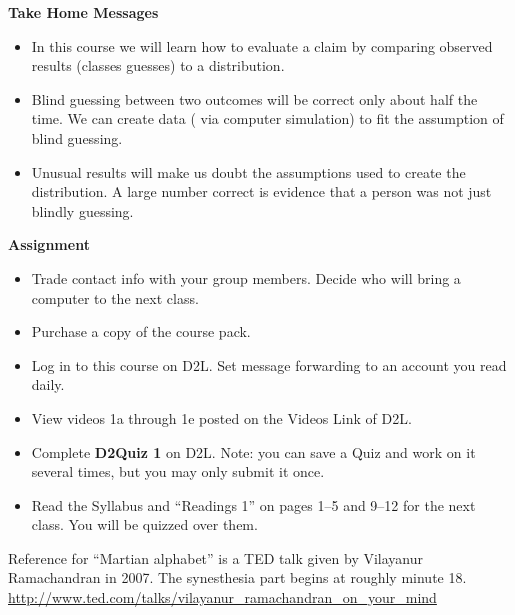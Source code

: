 \begin{center}
  {\bf Take Home Messages}
\end{center}
  \begin{itemize}
  \item In this course we will learn how to evaluate a claim by
    comparing observed results (classes guesses) to a distribution.

  \item Blind guessing between two outcomes will be correct only
    about half the time. We can create data ( via computer simulation)
    to fit the assumption of blind guessing.

  \item Unusual results will make us doubt the assumptions used to
    create the distribution.  A large number correct is evidence that
    a person was not just blindly guessing.
  \end{itemize} \vspace{.1in}

{\bf Assignment}
\begin{itemize}
\item  Trade contact info with your group members.  Decide who will
  bring a computer to the next class.
\item   Purchase a copy of the course pack.
\item   Log in to this course on D2L. Set message forwarding to an
  account you read daily.
\item View videos 1a through 1e posted on the Videos Link of D2L.
\item  Complete {\bf D2Quiz 1} on D2L.  Note: you can save a Quiz and
  work on it several times, but you may only submit it once.
\item Read the Syllabus and ``Readings 1'' on pages 1--5 and 9--12 for
  the next class. You will be quizzed over them. 
\end{itemize}


Reference for ``Martian alphabet'' is a TED talk given by Vilayanur
Ramachandran in 2007. The synesthesia part begins at roughly minute 18.
\url{http://www.ted.com/talks/vilayanur_ramachandran_on_your_mind}